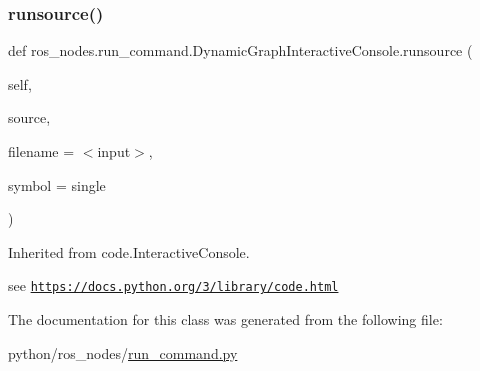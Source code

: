 \subsubsection{\texorpdfstring{runsource()}{runsource()}}
{\footnotesize\ttfamily def ros\+\_\+nodes.\+run\+\_\+command.\+Dynamic\+Graph\+Interactive\+Console.\+runsource (\begin{DoxyParamCaption}\item[{}]{self,  }\item[{}]{source,  }\item[{}]{filename = {\ttfamily \textquotesingle{}$<$input$>$\textquotesingle{}},  }\item[{}]{symbol = {\ttfamily \textquotesingle{}single\textquotesingle{}} }\end{DoxyParamCaption})}



Inherited from code.\+Interactive\+Console. 

see \href{https://docs.python.org/3/library/code.html}{\tt https\+://docs.\+python.\+org/3/library/code.\+html} 

The documentation for this class was generated from the following file\+:\begin{DoxyCompactItemize}
\item 
python/ros\+\_\+nodes/\hyperlink{run__command_8py}{run\+\_\+command.\+py}\end{DoxyCompactItemize}
